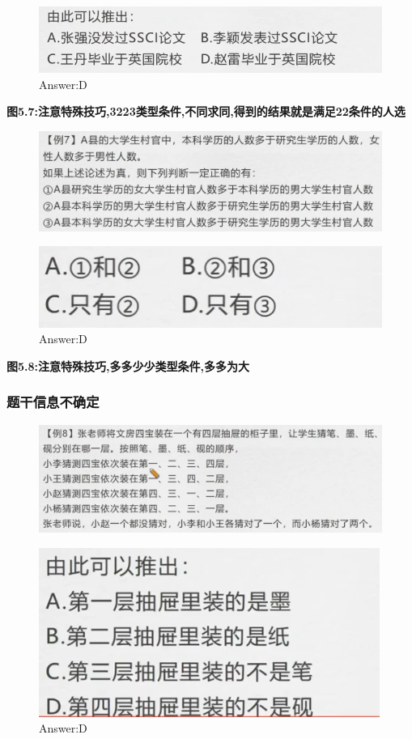 \documentclass{article}
\numberwithin{equation}{section}						%
\numberwithin{figure}{section}							%
\begin{document}
\begin{sloppypar}
\begin{figure}[H]
     \centering
     \includegraphics[width=0.45\linewidth]{197.png}
		\caption{Answer:D}
\end{figure}

\textbf{图5.7:注意特殊技巧,3223类型条件,不同求同,得到的结果就是满足22条件的人选}

\begin{figure}[H]
     \centering
     \includegraphics[width=0.6\linewidth]{198.png}
\end{figure}

\begin{figure}[H]
     \centering
     \includegraphics[width=0.3\linewidth]{199.png}
		\caption{Answer:D}
\end{figure}

\textbf{图5.8:注意特殊技巧,多多少少类型条件,多多为大}


\subsubsection{题干信息不确定}

\begin{figure}[H]
     \centering
     \includegraphics[width=0.6\linewidth]{200.png}
\end{figure}

\begin{figure}[H]
     \centering
     \includegraphics[width=0.3\linewidth]{201.png}
		\caption{Answer:D}
\end{figure}


\end{sloppypar}
\end{document}
